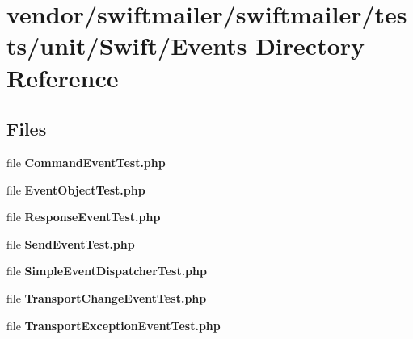 \section{vendor/swiftmailer/swiftmailer/tests/unit/\+Swift/\+Events Directory Reference}
\label{dir_00637091996cf4f5015873ae470b9f91}
\subsection*{Files}
\begin{DoxyCompactItemize}
\item 
file {\bf Command\+Event\+Test.\+php}
\item 
file {\bf Event\+Object\+Test.\+php}
\item 
file {\bf Response\+Event\+Test.\+php}
\item 
file {\bf Send\+Event\+Test.\+php}
\item 
file {\bf Simple\+Event\+Dispatcher\+Test.\+php}
\item 
file {\bf Transport\+Change\+Event\+Test.\+php}
\item 
file {\bf Transport\+Exception\+Event\+Test.\+php}
\end{DoxyCompactItemize}
